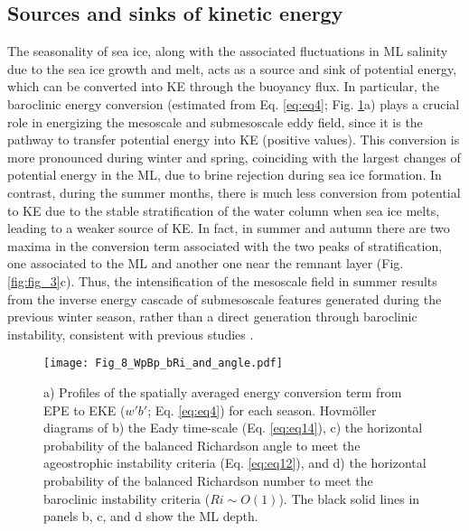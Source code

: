 \documentclass[draft]{agujournal2019}
\begin{document}
\subsection{Sources and sinks of kinetic energy}
\label{sec3.3}

The seasonality of sea ice, along with the associated fluctuations in ML salinity due to the sea ice growth and melt, acts as a source and sink of potential energy, which can be converted into KE through the buoyancy flux. In particular, the baroclinic energy conversion (estimated from Eq. \ref{eq:eq4}; Fig. \ref{fig:fig_8}a) plays a crucial role in energizing the mesoscale and submesoscale eddy field, since it is the pathway to transfer potential energy into KE (positive values). This conversion is more pronounced during winter and spring, coinciding with the largest changes of potential energy in the ML, due to brine rejection during sea ice formation. In contrast, during the summer months, there is much less conversion from potential to KE due to the stable stratification of the water column when sea ice melts, leading to a weaker source of KE. In fact, in summer and autumn there are two maxima in the conversion term associated with the two peaks of stratification, one associated to the ML and another one near the remnant layer (Fig. \ref{fig:fig_3}c). Thus, the intensification of the mesoscale field in summer results from the inverse energy cascade of submesoscale features generated during the previous winter season, rather than a direct generation through baroclinic instability, consistent with previous studies \citep{Steinberg_seasonality_2022, Qiu_seasonal_2014}.

\begin{figure}[t!]
  \texttt{[image: Fig\_8\_WpBp\_bRi\_and\_angle.pdf]}
  \caption{a) Profiles of the spatially averaged energy conversion term from EPE to EKE ($w'b'$; Eq. \ref{eq:eq4}) for each season. Hovm\"oller diagrams of b) the Eady time-scale (Eq. \ref{eq:eq14}), c) the horizontal probability of the balanced Richardson angle to meet the ageostrophic instability criteria (Eq. \ref{eq:eq12}), and d) the horizontal probability of the balanced Richardson number to meet the baroclinic instability criteria ($Ri \sim O(1)$). The black solid lines in panels b, c, and d show the ML depth.}
  \label{fig:fig_8}
\end{figure}
\end{document}

